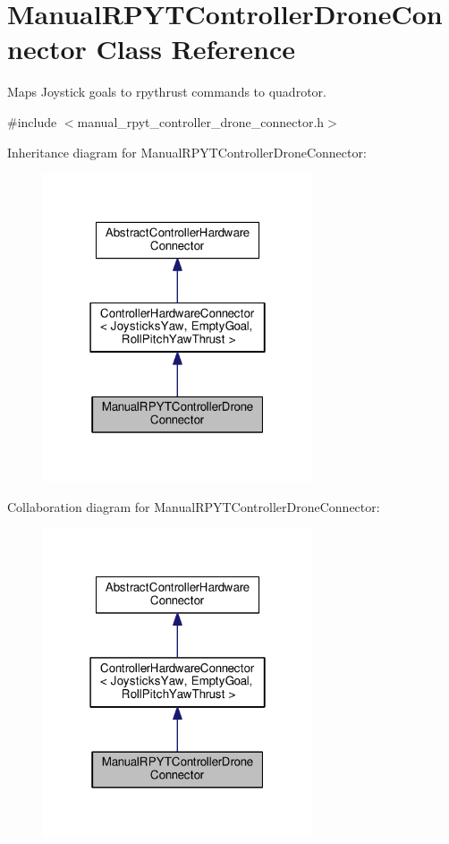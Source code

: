 \hypertarget{classManualRPYTControllerDroneConnector}{\section{Manual\-R\-P\-Y\-T\-Controller\-Drone\-Connector Class Reference}
\label{classManualRPYTControllerDroneConnector}
}


Maps Joystick goals to rpythrust commands to quadrotor.  




{\ttfamily \#include $<$manual\-\_\-rpyt\-\_\-controller\-\_\-drone\-\_\-connector.\-h$>$}



Inheritance diagram for Manual\-R\-P\-Y\-T\-Controller\-Drone\-Connector\-:\nopagebreak
\begin{figure}[H]
\begin{center}
\leavevmode
\includegraphics[width=226pt]{classManualRPYTControllerDroneConnector__inherit__graph}
\end{center}
\end{figure}


Collaboration diagram for Manual\-R\-P\-Y\-T\-Controller\-Drone\-Connector\-:\nopagebreak
\begin{figure}[H]
\begin{center}
\leavevmode
\includegraphics[width=226pt]{classManualRPYTControllerDroneConnector__coll__graph}
\end{center}
\end{figure}
